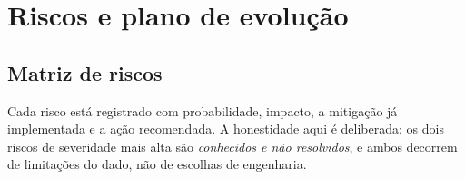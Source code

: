\chapter{Riscos e plano de evolução}
\label{cap:riscos}

\section{Matriz de riscos}

Cada risco está registrado com probabilidade, impacto, a mitigação já
implementada e a ação recomendada. A honestidade aqui é deliberada: os dois
riscos de severidade mais alta são \emph{conhecidos e não resolvidos}, e ambos
decorrem de limitações do dado, não de escolhas de engenharia.

